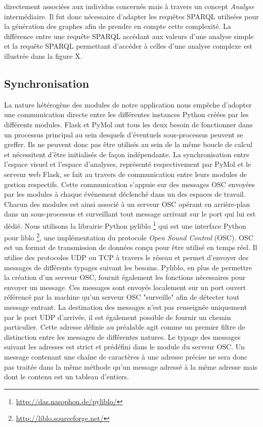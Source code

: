 directement associées aux individus concernés mais à travers un concept \textit{Analyse} intermédiaire. Il fut donc nécessaire d'adapter les requêtes SPARQL utilisées pour la génération des graphes afin de prendre en compte cette complexité. La différence entre une requête SPARQL accédant aux valeurs d'une analyse simple et la requête SPARQL permettant d'accéder à celles d'une analyse complexe est illustrée dans la figure X.

\subsection{Synchronisation}

La nature hétérogène des modules de notre application nous empêche d'adopter une communication directe entre les différentes instances Python créées par les différents modules. Flask et PyMol ont tous les deux besoin de fonctionner dans un processus principal au sein desquels d'éventuels sous-processus peuvent se greffer. Ils ne peuvent donc pas être utilisés au sein de la même boucle de calcul et nécessitent d'être initialisés de façon indépendante. La synchronisation entre l'espace visuel et l'espace d'analyses, représenté respectivement par PyMol et le serveur web Flask, se fait au travers de communication entre leurs modules de gestion respectifs. Cette communication s'appuie sur des messages OSC envoyées par les modules à chaque événement déclenché dans un des espaces de travail. Chacun des modules est ainsi associé à un serveur OSC opérant en arrière-plan dans un sous-processus et surveillant tout message arrivant sur le port qui lui est dédié. Nous utilisons la librairie Python pyliblo \footnote{\url{http://das.nasophon.de/pyliblo/}} qui est une interface Python pour liblo \footnote{\url{http://liblo.sourceforge.net/}}, une implémentation du protocole \textit{Open Sound Control} (OSC). OSC est un format de transmission de données conçu pour être utilisé en temps réel. Il utilise des protocoles UDP ou TCP à travers le réseau et permet d'envoyer des messages de différents typages suivant les besoins. Pyliblo, en plus de permettre la création d'un serveur OSC, fournit également les fonctions nécessaires pour envoyer un message. Ces messages sont envoyés localement sur un port ouvert référencé par la machine qu'un serveur OSC "surveille" afin de détecter tout message entrant. La destination des messages n'est pas renseignée uniquement par le port UDP d'arrivée, il est également possible de fournir un chemin particulier. Cette adresse définie au préalable agit comme un premier filtre de distinction entre les messages de différentes natures. Le typage des messages suivant les adresses est strict et prédéfini dans le module du serveur OSC. Un message contenant une chaîne de caractères à une adresse précise ne sera donc pas traitée dans la même méthode qu'un message adressé à la même adresse mais dont le contenu est un tableau d'entiers.
